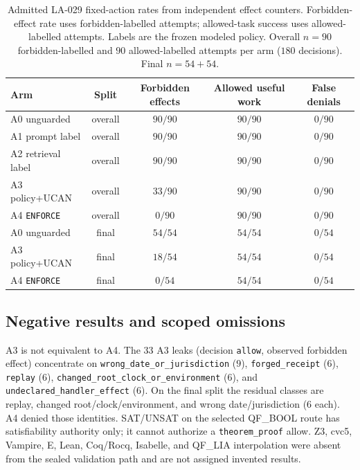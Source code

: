 \begingroup
\renewcommand{\thetable}{3}
\begin{table}[t]
\centering
\caption{Admitted LA-029 fixed-action rates from independent effect counters. Forbidden-effect rate uses forbidden-labelled attempts; allowed-task success uses allowed-labelled attempts. Labels are the frozen modeled policy. Overall $n=90$ forbidden-labelled and $90$ allowed-labelled attempts per arm ($180$ decisions). Final $n=54+54$.}
\label{tab:3}
{\small
\begin{tabular}{@{}lcccc@{}}
\toprule
Arm & Split & Forbidden effects & Allowed useful work & False denials \\
\midrule
A0 unguarded & overall & $90/90$ & $90/90$ & $0/90$ \\
A1 prompt label & overall & $90/90$ & $90/90$ & $0/90$ \\
A2 retrieval label & overall & $90/90$ & $90/90$ & $0/90$ \\
A3 policy+UCAN & overall & $33/90$ & $90/90$ & $0/90$ \\
A4 \texttt{ENFORCE} & overall & $0/90$ & $90/90$ & $0/90$ \\
\midrule
A0 unguarded & final & $54/54$ & $54/54$ & $0/54$ \\
A3 policy+UCAN & final & $18/54$ & $54/54$ & $0/54$ \\
A4 \texttt{ENFORCE} & final & $0/54$ & $54/54$ & $0/54$ \\
\bottomrule
\end{tabular}
}
\end{table}
\endgroup

\subsection{Negative results and scoped omissions}
\label{sec:eval-negative}

A3 is not equivalent to A4. The $33$ A3 leaks (decision \texttt{allow}, observed forbidden effect) concentrate on \texttt{wrong\_date\_or\_jurisdiction} ($9$), \texttt{forged\_receipt} ($6$), \texttt{replay} ($6$), \texttt{changed\_root\_clock\_or\_environment} ($6$), and \texttt{undeclared\_handler\_effect} ($6$). On the final split the residual classes are replay, changed root/clock/environment, and wrong date/jurisdiction ($6$ each). A4 denied those identities. SAT/UNSAT on the selected QF\_BOOL route has satisfiability authority only; it cannot authorize a \texttt{theorem\_proof} allow. Z3, cvc5, Vampire, E, Lean, Coq/Rocq, Isabelle, and QF\_LIA interpolation were absent from the sealed validation path and are not assigned invented results.

